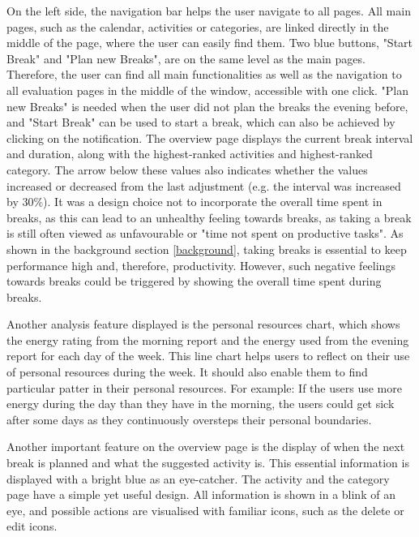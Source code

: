 \documentclass{hasel_thesis}
\begin{document}
On the left side, the navigation bar helps the user navigate to all pages. All main pages, such as the calendar, activities or categories, are linked directly in the middle of the page, where the user can easily find them. Two blue buttons, "Start Break" and "Plan new Breaks", are on the same level as the main pages. Therefore, the user can find all main functionalities as well as the navigation to all evaluation pages in the middle of the window, accessible with one click. "Plan new Breaks" is needed when the user did not plan the breaks the evening before, and "Start Break" can be used to start a break, which can also be achieved by clicking on the notification. The overview page displays the current break interval and duration, along with the highest-ranked activities and highest-ranked category. The arrow below these values also indicates whether the values increased or decreased from the last adjustment (e.g. the interval was increased by 30\%). It was a design choice not to incorporate the overall time spent in breaks, as this can lead to an unhealthy feeling towards breaks, as taking a break is still often viewed as unfavourable or "time not spent on productive tasks". As shown in the background section \ref{background}, taking breaks is essential to keep performance high and, therefore, productivity. However, such negative feelings towards breaks could be triggered by showing the overall time spent during breaks.

Another analysis feature displayed is the personal resources chart, which shows the energy rating from the morning report and the energy used from the evening report for each day of the week. This line chart helps users to reflect on their use of personal resources during the week. It should also enable them to find particular patter in their personal resources. For example: If the users use more energy during the day than they have in the morning, the users could get sick after some days as they continuously oversteps their personal boundaries. 

Another important feature on the overview page is the display of when the next break is planned and what the suggested activity is. This essential information is displayed with a bright blue as an eye-catcher. The activity and the category page have a simple yet useful design. All information is shown in a blink of an eye, and possible actions are visualised with familiar icons, such as the delete or edit icons. 
\end{document}
